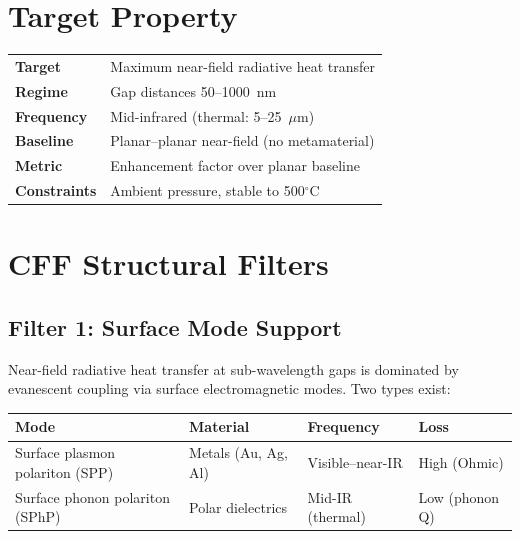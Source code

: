 \documentclass[11pt, a4paper]{article}
\begin{document}
\tableofcontents

\section{Target Property}

\begin{center}
\begin{tabular}{@{}ll@{}}
\toprule
\textbf{Target} & Maximum near-field radiative heat transfer \\
\textbf{Regime} & Gap distances 50--1000~nm \\
\textbf{Frequency} & Mid-infrared (thermal: 5--25~$\mu$m) \\
\textbf{Baseline} & Planar--planar near-field (no metamaterial) \\
\textbf{Metric} & Enhancement factor over planar baseline \\
\textbf{Constraints} & Ambient pressure, stable to 500$^\circ$C \\
\bottomrule
\end{tabular}
\end{center}

\section{CFF Structural Filters}

\subsection{Filter 1: Surface Mode Support}

Near-field radiative heat transfer at sub-wavelength gaps is
dominated by evanescent coupling via surface electromagnetic
modes. Two types exist:

\begin{center}
\begin{tabular}{@{}llll@{}}
\toprule
\textbf{Mode} & \textbf{Material} & \textbf{Frequency} &
  \textbf{Loss} \\
\midrule
Surface plasmon polariton (SPP) & Metals (Au, Ag, Al) &
  Visible--near-IR & High (Ohmic) \\
Surface phonon polariton (SPhP) & Polar dielectrics &
  Mid-IR (thermal) & Low (phonon Q) \\
\bottomrule
\end{tabular}
\end{center}
\end{document}
